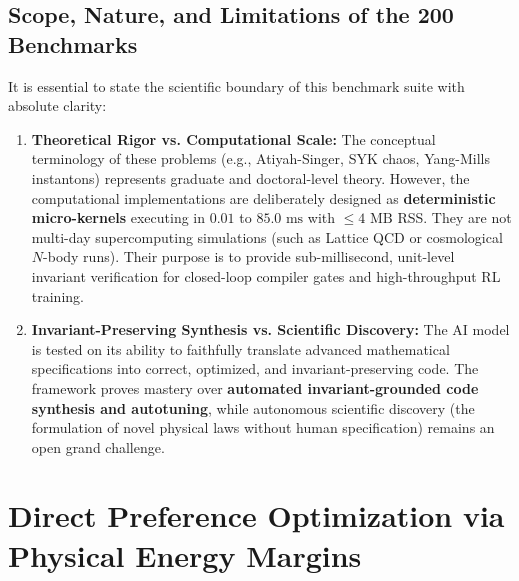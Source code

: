 \documentclass[10pt,journal,compsoc,twocolumn]{IEEEtran}
\theoremstyle{definition}
\begin{document}
\begin{table}[h]
\centering
\caption{Sample Empirical Execution Data: Complex Applied Python}
\label{tab:py}
\end{table}

\subsection{Scope, Nature, and Limitations of the 200 Benchmarks}
It is essential to state the scientific boundary of this benchmark suite with absolute clarity:
\begin{enumerate}
    \item \textbf{Theoretical Rigor vs. Computational Scale:} The conceptual terminology of these problems (e.g., Atiyah-Singer, SYK chaos, Yang-Mills instantons) represents graduate and doctoral-level theory. However, the computational implementations are deliberately designed as \textbf{deterministic micro-kernels} executing in $0.01$ to $85.0\text{ ms}$ with $\le 4\text{ MB}$ RSS. They are not multi-day supercomputing simulations (such as Lattice QCD or cosmological $N$-body runs). Their purpose is to provide sub-millisecond, unit-level invariant verification for closed-loop compiler gates and high-throughput RL training.
    \item \textbf{Invariant-Preserving Synthesis vs. Scientific Discovery:} The AI model is tested on its ability to faithfully translate advanced mathematical specifications into correct, optimized, and invariant-preserving code. The framework proves mastery over \textbf{automated invariant-grounded code synthesis and autotuning}, while autonomous scientific discovery (the formulation of novel physical laws without human specification) remains an open grand challenge.
\end{enumerate}

\section{Direct Preference Optimization via Physical Energy Margins}
\end{document}
